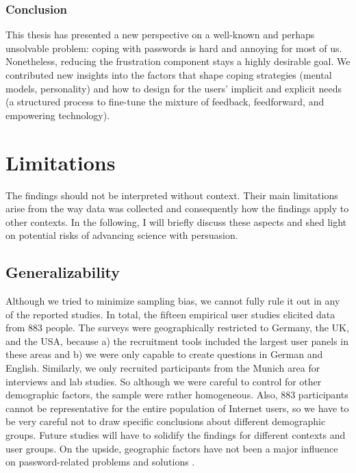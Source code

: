 \subsubsection{Conclusion}
This thesis has presented a new perspective on a well-known and perhaps unsolvable problem: coping with passwords is hard and annoying for most of us. Nonetheless, reducing the frustration component stays a highly desirable goal. We contributed new insights into the factors that shape coping strategies (mental models, personality) and how to design for the users' implicit and explicit needs (a structured process to fine-tune the mixture of feedback, feedforward, and empowering technology). 

\section{Limitations}
The findings should not be interpreted without context. Their main limitations arise from the way data was collected and consequently how the findings apply to other contexts. In the following, I will briefly discuss these aspects and shed light on potential risks of advancing science with persuasion. 

\subsection{Generalizability}
Although we tried to minimize sampling bias, we cannot fully rule it out in any of the reported studies. In total, the fifteen empirical user studies elicited data from 883 people. The surveys were geographically restricted to Germany, the UK, and the USA, because a) the recruitment tools included the largest user panels in these areas and b) we were only capable to create questions in German and English. Similarly, we only recruited participants from the Munich area for interviews and lab studies. So although we were careful to control for other demographic factors, the sample were rather homogeneous. Also, 883 participants cannot be representative for the entire population of Internet users, so we have to be very careful not to draw specific conclusions about different demographic groups. Future studies will have to solidify the findings for different contexts and user groups. On the upside, geographic factors have not been a major influence on password-related problems and solutions \cite{Violettas2014PasswordsAvoidGreece, Wang2015ChinesePWs}. 


